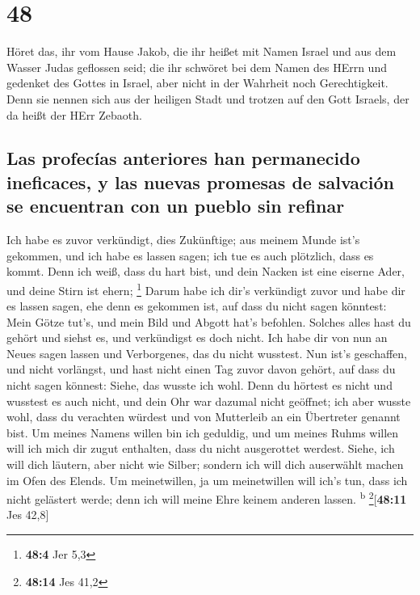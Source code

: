 \hypertarget{section-47}{%
\section{48}\label{section-47}}

 Höret das, ihr vom Hause Jakob, die ihr heißet mit Namen
Israel und aus dem Wasser Judas geflossen seid; die ihr schwöret bei dem
Namen des HErrn und gedenket des Gottes in Israel, aber nicht in der
Wahrheit noch Gerechtigkeit.  Denn sie nennen sich aus der
heiligen Stadt und trotzen auf den Gott Israels, der da heißt der HErr
Zebaoth.

\hypertarget{las-profecuxedas-anteriores-han-permanecido-ineficaces-y-las-nuevas-promesas-de-salvaciuxf3n-se-encuentran-con-un-pueblo-sin-refinar}{%
\subsection{Las profecías anteriores han permanecido ineficaces, y las
nuevas promesas de salvación se encuentran con un pueblo sin
refinar}\label{las-profecuxedas-anteriores-han-permanecido-ineficaces-y-las-nuevas-promesas-de-salvaciuxf3n-se-encuentran-con-un-pueblo-sin-refinar}}

 Ich habe es zuvor verkündigt, dies Zukünftige; aus meinem
Munde ist's gekommen, und ich habe es lassen sagen; ich tue es auch
plötzlich, dass es kommt.  Denn ich weiß, dass du hart
bist, und dein Nacken ist eine eiserne Ader, und deine Stirn ist ehern;
\footnote{\textbf{48:4} Jer 5,3}  Darum habe ich dir's
verkündigt zuvor und habe dir es lassen sagen, ehe denn es gekommen ist,
auf dass du nicht sagen könntest: Mein Götze tut's, und mein Bild und
Abgott hat's befohlen.  Solches alles hast du gehört und
siehst es, und verkündigst es doch nicht. Ich habe dir von nun an Neues
sagen lassen und Verborgenes, das du nicht wusstest.  Nun
ist's geschaffen, und nicht vorlängst, und hast nicht einen Tag zuvor
davon gehört, auf dass du nicht sagen könnest: Siehe, das wusste ich
wohl.  Denn du hörtest es nicht und wusstest es auch
nicht, und dein Ohr war dazumal nicht geöffnet; ich aber wusste wohl,
dass du verachten würdest und von Mutterleib an ein Übertreter genannt
bist.  Um meines Namens willen bin ich geduldig, und um
meines Ruhms willen will ich mich dir zugut enthalten, dass du nicht
ausgerottet werdest.  Siehe, ich will dich läutern, aber
nicht wie Silber; sondern ich will dich auserwählt machen im Ofen des
Elends.  Um meinetwillen, ja um meinetwillen will ich's
tun, dass ich nicht gelästert werde; denn ich will meine Ehre keinem
anderen lassen. \textsuperscript{b} \footnote{\textbf{48:14} Jes 41,2}{[}\textbf{48:11}
Jes 42,8{]}

